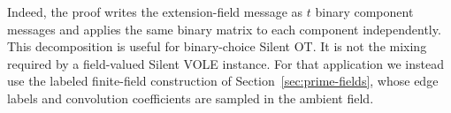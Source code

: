 Indeed, the proof writes the extension-field message as $t$ binary component
messages and applies the same binary matrix to each component independently.
This decomposition is useful for binary-choice Silent OT.  It is not the
mixing required by a field-valued Silent VOLE instance.  For that application
we instead use the labeled finite-field construction of
Section~\ref{sec:prime-fields}, whose edge labels and convolution coefficients
are sampled in the ambient field.
